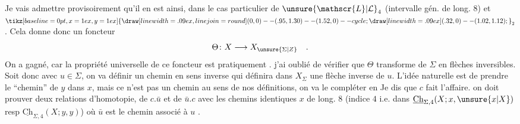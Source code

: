 Je vais admettre provisoirement qu'il en est ainsi,
 dans le cas particulier de $\unsure{\mathscr{L}|\mathcal{L}}_4$ (intervalle gén. de long. $8$)
et $\mathord{\tikz[baseline=0pt,x=1ex,y=1ex]{\draw[line width=.09ex,line join=round] (0,0) -- (.95,1.30) -- (1.52,0) -- cycle; \draw[line width=.09ex] (.32,0) -- (1.02,1.12);}}_2$. Cela donne donc un foncteur
\[
\Theta\colon X\longrightarrow X_{\unsure{\Sigma|Z}}\quad .
\]
On a gagné, car la propriété universelle de ce
foncteur est pratiquement .   j'ai
oublié de vérifier que $\Theta$ transforme   de $\Sigma$
en flèches inversibles. Soit donc
avec $u\in\Sigma$, on va définir un chemin en sens
inverse
qui définira dans $X_\Sigma$ une flèche inverse de $u$.
L'idée naturelle est de prendre le ``chemin''
de $y$ dans $x$, mais ce n'est pas un chemin au sens
de nos définitions, on va le compléter en
Je dis que $c$ fait l'affaire. on doit prouver
deux relations d'homotopie, de  $c.\bar{u}$ et
de $\bar{u}.c$ avec les chemins identiques  $x$ de long.
$8$ (indice $4$ i.e. dans $\underline{\mathrm{Ch}}_{\Sigma,4}(X;x,\unsure{x|X})$ resp $\underline{\mathrm{Ch}}_{\Sigma,4}(X;y,y)$)
où $\bar{u}$ est le chemin associé à $u$
.

